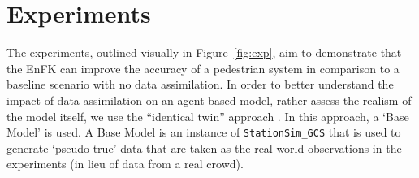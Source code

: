 \documentclass{article}
\begin{document}
\section{Experiments}\label{sec:exp}

The experiments, outlined visually in Figure~\ref{fig:exp}, aim to demonstrate that the EnFK can improve the accuracy of a pedestrian system in comparison to a baseline scenario with no data assimilation. In order to better understand the impact of data assimilation on an agent-based model, rather assess the realism of the model itself, we use the ``identical twin'' approach \citep{lueck_who_2019}. In this approach, a `Base Model' is used. A Base Model is an instance of \texttt{StationSim\_GCS} that is used to generate `pseudo-true' data that are taken as the real-world observations in the experiments (in lieu of data from a real crowd).

\end{document}
